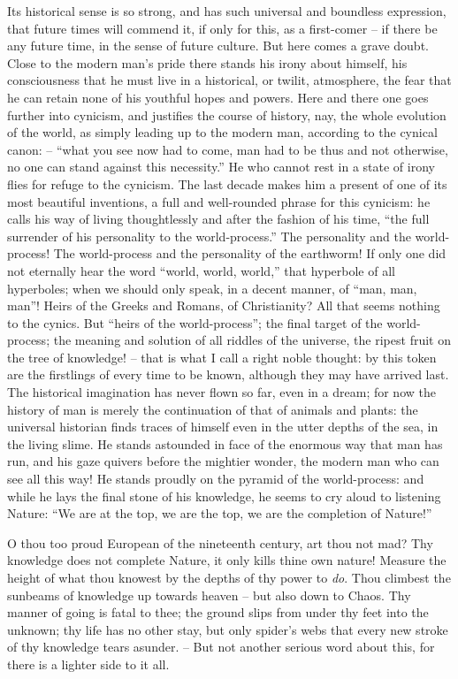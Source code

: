  Its historical sense is so
strong, and has such universal and boundless expression, that future
times will commend it, if only for this, as a first-comer -- if there
be any future time, in the sense of future culture. But here comes a
grave doubt. Close to the modern man's pride there stands his irony
about himself, his consciousness that he must live in a historical,
or twilit, atmosphere, the fear that he can retain none of his
youthful hopes and powers. Here and there one goes further into
cynicism, and justifies the course of history, nay, the whole
evolution of the world, as simply leading up to the modern man,
according to the cynical canon: -- \enquote{what you see now had to come, man
had to be thus and not otherwise, no one can stand against this
necessity.} He who cannot rest in a state of irony flies for refuge
to the cynicism. The last decade makes him a present of one of its
most beautiful inventions, a full and well-rounded phrase for this
cynicism: he calls his way of living thoughtlessly and after the
fashion of his time, \enquote{the full surrender of his personality to the
world-process.} The personality and the world-process! The
world-process and the personality of the earthworm! If only one did
not eternally hear the word \enquote{world, world, world,} that hyperbole of
all hyperboles; when we should only speak, in a decent manner, of
\enquote{man, man, man}! Heirs of the Greeks and Romans, of Christianity? All
that seems nothing to the cynics. But \enquote{heirs of the world-process};
the final target of the world-process; the meaning and solution of
all riddles of the universe, the ripest fruit on the tree of
knowledge! -- that is what I call a right noble thought: by this token
are the firstlings of every time to be known, although they may have
arrived last. The historical imagination has never flown so far, even
in a dream; for now the history of man is merely the continuation of
that of animals and plants: the universal historian finds traces of
himself even in the utter depths of the sea, in the living slime. He
stands astounded in face of the enormous way that man has run, and
his gaze quivers before the mightier wonder, the modern man who can
see all this way! He stands proudly on the pyramid of the
world-process: and while he lays the final stone of his knowledge, he
seems to cry aloud to listening Nature: \enquote{We are at the top, we are
the top, we are the completion of Nature!}

O thou too proud European of the nineteenth century, art thou not
mad? Thy knowledge does not complete Nature, it only kills thine own
nature! Measure the height of what thou knowest by the depths of thy
power to \textit{do}. Thou climbest the sunbeams of knowledge up towards
heaven -- but also down to Chaos. Thy manner of going is fatal to thee;
the ground slips from under thy feet into the unknown; thy life has
no other stay, but only spider's webs that every new stroke of thy
knowledge tears asunder. -- But not another serious word about this,
for there is a lighter side to it all.

